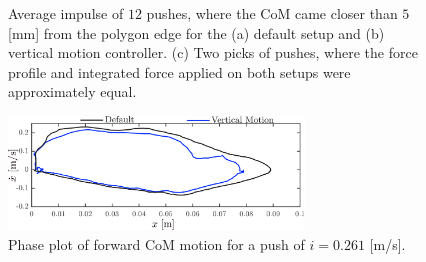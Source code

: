 \begin{figure}
\begin{subfigure}{0.32\textwidth}
  \caption{}
   \label{fig:imp3}
  \end{subfigure}
  \caption{Average impulse of $12$ pushes, where the \ac{CoM} came closer than $5$ [mm] from the polygon edge for the (a) default setup and (b) vertical motion controller. (c) Two picks of pushes, where the force profile and integrated force applied on both setups were approximately equal. }
  \label{fig:impulsecompare}
\end{figure}

\begin{figure}
\centering
\includegraphics[width=0.7\textwidth]{STYLESTUFF/valcomparephaseHW.png}
\caption{Phase plot of forward \ac{CoM} motion for a push of $i=0.261$ [m/s].}
\label{fig:valcomparephaseHW}
\end{figure}
